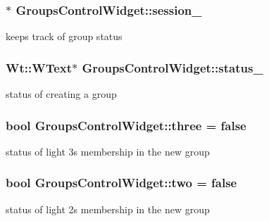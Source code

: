 \subsubsection[{\texorpdfstring{session\+\_\+}{session_}}]{$\ast$ Groups\+Control\+Widget\+::session\+\_\+\hspace{0.3cm}{\ttfamily [private]}}\hypertarget{classGroupsControlWidget_a22dc704f954395ff53d67c51dbec933f}{}\label{classGroupsControlWidget_a22dc704f954395ff53d67c51dbec933f}
keeps track of group status 
\subsubsection[{\texorpdfstring{status\+\_\+}{status_}}]{\setlength{\rightskip}{0pt plus 5cm}Wt\+::\+W\+Text$\ast$ Groups\+Control\+Widget\+::status\+\_\+\hspace{0.3cm}{\ttfamily [private]}}\hypertarget{classGroupsControlWidget_aa20f4ee341f245754611fa4494b38ecd}{}\label{classGroupsControlWidget_aa20f4ee341f245754611fa4494b38ecd}
status of creating a group 
\subsubsection[{\texorpdfstring{three}{three}}]{\setlength{\rightskip}{0pt plus 5cm}bool Groups\+Control\+Widget\+::three = false\hspace{0.3cm}{\ttfamily [private]}}\hypertarget{classGroupsControlWidget_a441299ffc41342f9c91d3d6f319732ed}{}\label{classGroupsControlWidget_a441299ffc41342f9c91d3d6f319732ed}
status of light 3\textquotesingle{}s membership in the new group 
\subsubsection[{\texorpdfstring{two}{two}}]{\setlength{\rightskip}{0pt plus 5cm}bool Groups\+Control\+Widget\+::two = false\hspace{0.3cm}{\ttfamily [private]}}\hypertarget{classGroupsControlWidget_a4d0f1619ed1d0976fc48ea38262a5e5c}{}\label{classGroupsControlWidget_a4d0f1619ed1d0976fc48ea38262a5e5c}
status of light 2\textquotesingle{}s membership in the new group 
